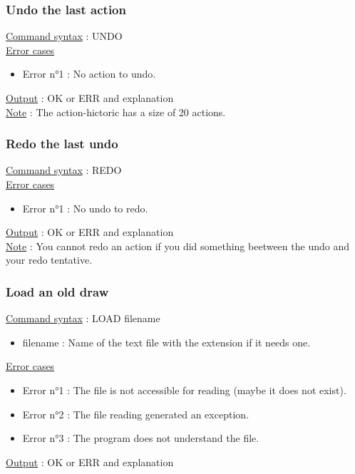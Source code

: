 \documentclass[a4paper, 12pts]{article}
\begin{document}
		\subsubsection{Undo the last action}
			\uline{Command syntax} :
			UNDO\\
			\uline{Error cases}
			\begin{itemize}
				\item Error n°1 : No action to undo.
			\end{itemize}
			\uline{Output} : OK or ERR and explanation\\
			\uline{Note} : 
			The action-hictoric has a size of 20 actions.

		\subsubsection{Redo the last undo}
			\uline{Command syntax} :
			REDO\\
			\uline{Error cases}
			\begin{itemize}
				\item Error n°1 : No undo to redo.
			\end{itemize}
			\uline{Output} : OK or ERR and explanation\\
			\uline{Note} : 
			You cannot redo an action if you did something beetween the undo and your redo tentative.

		\subsubsection{Load an old draw}
			\uline{Command syntax} :
			LOAD filename
			\begin{itemize}
				\item filename : Name of the text file with the extension if it needs one.
			\end{itemize}
			\uline{Error cases}
			\begin{itemize}
				\item Error n°1 : The file is not accessible for reading (maybe it does not exist).
				\item Error n°2 : The file reading generated an exception.
				\item Error n°3 : The program does not understand the file.
			\end{itemize}
			\uline{Output} : OK or ERR and explanation\\
\end{document}
